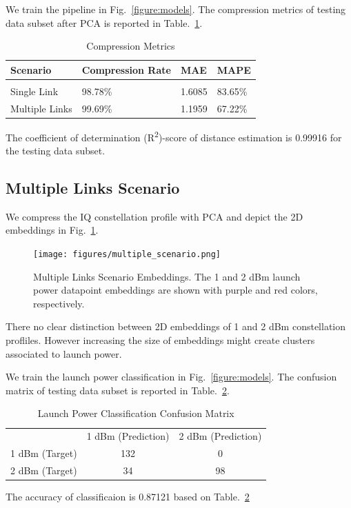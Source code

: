 \documentclass[lettersize,journal, one-column]{IEEEtran}
\begin{document}
We train the pipeline in Fig.~\ref{figure:models}.
The compression metrics of testing data subset after PCA is reported in Table.~\ref{table:compression}.
\begin{table}
    \centering
    \caption{Compression Metrics}
    \begin{tabular}{l l l l}
        \hline
        \hline
        Scenario & Compression Rate & MAE & MAPE \\
		\hline \\
        Single Link & 98.78\% & 1.6085 & 83.65\% \\
        Multiple Links & 99.69\% & 1.1959 & 67.22\% \\
        \hline
    \end{tabular}
    \label{table:compression}
\end{table}

The coefficient of determination (R\textsuperscript{2})-score of distance estimation is 0.99916 for the testing data subset.

\subsection{Multiple Links Scenario}
We compress the IQ constellation profile with PCA and depict the 2D embeddings in Fig.~\ref{figure:multiple_whole}.
\begin{figure}
	\centering
    \texttt{[image: figures/multiple\_scenario.png]}
    \caption{Multiple Links Scenario Embeddings. The 1 and 2 dBm launch power datapoint embeddings are shown with purple and red colors, respectively.}
	\label{figure:multiple_whole}
\end{figure}
There no clear distinction between 2D embeddings of 1 and 2 dBm constellation profliles.
However increasing the size of embeddings might create clusters associated to launch power.

We train the launch power classification in Fig.~\ref{figure:models}.
The confusion matrix of testing data subset is reported in Table.~\ref{table:confusion_mat}.
\begin{table}
    \centering
    \caption{Launch Power Classification Confusion Matrix}
    \begin{tabular}{l l l}
        & 1 dBm (Prediction) & 2 dBm (Prediction) \\
        \cline{2-3}
        1 dBm (Target) & \multicolumn{1}{|c|}{132} & \multicolumn{1}{c|}{0} \\
        \cline{2-3}
        2 dBm (Target) & \multicolumn{1}{|c|}{34} & \multicolumn{1}{c|}{98} \\
        \cline{2-3}
    \end{tabular}
    \label{table:confusion_mat}
\end{table}
The accuracy of classificaion is 0.87121 based on Table.~\ref{table:confusion_mat}
\end{document}
